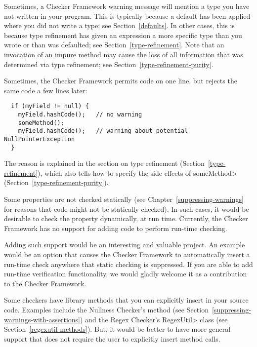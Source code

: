 Sometimes, a Checker Framework warning message will mention a type you have
not written in your program.  This is typically because a default has been
applied where you did not write a type; see Section~\ref{defaults}.  In
other cases, this is because type refinement has given an
expression a more specific type than you wrote or than was defaulted; see
Section~\ref{type-refinement}.
Note that an invocation of an impure method may cause the loss of all
information that was determined via type refinement; see
Section~\ref{type-refinement-purity}.



Sometimes, the Checker Framework permits code on one line, but rejects the
same code a few lines later:

\begin{Verbatim}
  if (myField != null) {
    myField.hashCode();   // no warning
    someMethod();
    myField.hashCode();   // warning about potential NullPointerException
  }
\end{Verbatim}

The reason is explained in the section on type refinement
(Section~\ref{type-refinement}), which also tells how to specify the side
effects of \<someMethod> (Section~\ref{type-refinement-purity}).



Some properties are not checked statically (see
Chapter~\ref{suppressing-warnings} for reasons that code might not be
statically checked).  In such cases, it would be desirable to check the
property dynamically, at run time.
Currently, the Checker Framework has no support for adding code to perform
run-time checking.

Adding such support would be an interesting and valuable project.
An example would be an option that causes the Checker Framework to
automatically insert a run-time check anywhere that static checking is
suppressed.
If you
are able to add run-time verification functionality, we would gladly
welcome it as a contribution to the Checker Framework.

Some checkers have library methods that you can explicitly insert in your
source code.
Examples include the Nullness Checker's
 method (see
Section~\ref{suppressing-warnings-with-assertions}) and the Regex Checker's
\<RegexUtil> class (see Section~\ref{regexutil-methods}).
But, it would be better to have more general support that does not require
the user to explicitly insert method calls.


